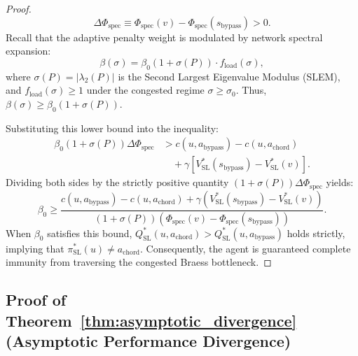 \documentclass[11pt,a4paper]{article}
\begin{document}
\begin{proof}
\begin{equation}
\Delta \Phi_{\text{spec}} \equiv \Phi_{\text{spec}}(v) - \Phi_{\text{spec}}(s_{\text{bypass}}) > 0.
\end{equation}
Recall that the adaptive penalty weight is modulated by network spectral expansion:
\begin{equation}
\beta(\sigma) = \beta_0 (1 + \sigma(P)) \cdot f_{\text{load}}(\sigma),
\end{equation}
where $\sigma(P) = |\lambda_2(P)|$ is the Second Largest Eigenvalue Modulus (SLEM), and $f_{\text{load}}(\sigma) \ge 1$ under the congested regime $\sigma \ge \sigma_0$. Thus, $\beta(\sigma) \ge \beta_0 (1 + \sigma(P))$.

Substituting this lower bound into the inequality:
\begin{equation}
\begin{split}
\beta_0 (1 + \sigma(P)) \Delta \Phi_{\text{spec}} &> c(u, a_{\text{bypass}}) - c(u, a_{\text{chord}}) \\
&\quad + \gamma \left[ V_{\text{SL}}^*(s_{\text{bypass}}) - V_{\text{SL}}^*(v) \right].
\end{split}
\end{equation}
Dividing both sides by the strictly positive quantity $(1 + \sigma(P)) \Delta \Phi_{\text{spec}}$ yields:
\begin{equation}
\beta_0 \ge \frac{c(u, a_{\text{bypass}}) - c(u, a_{\text{chord}}) + \gamma \left( V_{\text{SL}}^*(s_{\text{bypass}}) - V_{\text{SL}}^*(v) \right)}{(1 + \sigma(P)) \left( \Phi_{\text{spec}}(v) - \Phi_{\text{spec}}(s_{\text{bypass}}) \right)}.
\end{equation}
When $\beta_0$ satisfies this bound, $Q_{\text{SL}}^*(u, a_{\text{chord}}) > Q_{\text{SL}}^*(u, a_{\text{bypass}})$ holds strictly, implying that $\pi_{\text{SL}}^*(u) \ne a_{\text{chord}}$. Consequently, the agent is guaranteed complete immunity from traversing the congested Braess bottleneck.
\end{proof}

\subsection{Proof of Theorem~\ref{thm:asymptotic_divergence} (Asymptotic Performance Divergence)}
\label{subsec:proof_thm4}
\end{document}
